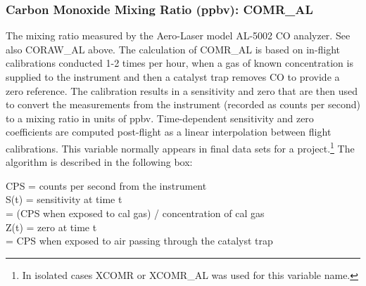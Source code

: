 \documentclass[
  english,
]{book}
\begin{document}
\hypertarget{comr-al}{%
\subsubsection*{Carbon Monoxide Mixing Ratio (ppbv): COMR\_AL}\label{comr-al}}

The mixing ratio measured by the Aero-Laser model AL-5002 CO analyzer. See also CORAW\_AL above. The calculation of COMR\_AL is based on in-flight calibrations conducted 1-2 times per hour, when a gas of known concentration is supplied to the instrument and then a catalyst trap removes CO to provide a zero reference. The calibration results in a sensitivity and zero that are then used to convert the measurements from the instrument (recorded as counts per second) to a mixing ratio in units of ppbv. Time-dependent sensitivity and zero coefficients are computed post-flight as a linear interpolation between flight calibrations. This variable normally appears in final data sets for a project.\footnote{In isolated cases XCOMR or XCOMR\_AL was used for this variable name.}
The algorithm is described in the following box:

CPS = counts per second from the instrument\\
S(t) = sensitivity
at time t\\
\hspace*{0.333em}\hspace*{0.333em}\hspace*{0.333em}\hspace*{0.333em}\hspace*{0.333em}\hspace*{0.333em}\hspace*{0.333em}= (CPS when exposed to cal gas) / concentration of cal gas\\
Z(t) = zero at time t\\
\hspace*{0.333em}\hspace*{0.333em}\hspace*{0.333em}\hspace*{0.333em}\hspace*{0.333em}\hspace*{0.333em}\hspace*{0.333em}= CPS when exposed to air passing through the catalyst trap
\end{document}
